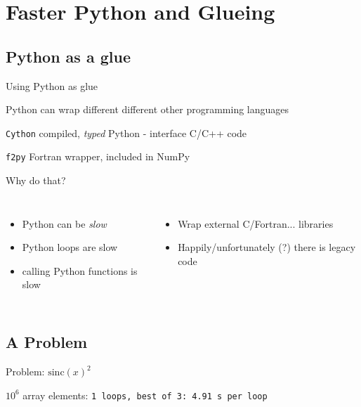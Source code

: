 \section{Faster Python and Glueing}

\subsection{Python as a glue}

\begin{frame}{Using Python as glue}

Python can wrap different different other programming languages\\[1ex]

\begin{exbox}{{\texttt{Cython}}}
    compiled, \emph{typed} Python - interface C/C++ code
\end{exbox}

\begin{exbox}{{\texttt{f2py}}}
    Fortran wrapper, included in NumPy
\end{exbox}

Why do that?
\begin{columns}

\begin{itemize}
    \item Python can be \emph{slow}
    \item Python loops are slow
    \item calling Python functions is slow
\end{itemize}

\begin{itemize}
    \item Wrap external C/Fortran... libraries
    \item Happily/unfortunately (?) there is legacy code
\end{itemize}

\end{columns}

\end{frame}


\subsection{A Problem}

\begin{frame}[fragile]{Problem: $\mathrm{sinc}(x)^{2}$}



\pause
$10^{6}$ array elements: {\texttt{1 loops, best of 3: 4.91 s per loop}}
\end{frame}


